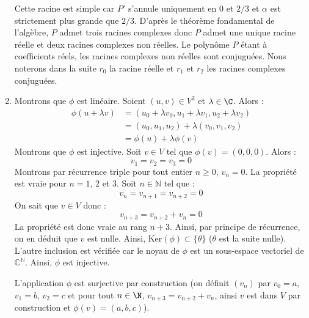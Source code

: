 \documentclass[a4paper,10pt]{report}
\begin{document}
\begin{enumerate}
\noindent Cette racine est simple car $P'$ s'annule uniquement en $0$ et $2/3$ et $\alpha$ est strictement plus grande que $2/3$. D'après le théorème fondamental de l'algèbre, $P$ admet trois racines complexes donc $P$ admet une unique racine réelle et deux racines complexes non réelles. Le polynôme $P$ étant à coefficients réels, les racines complexes non réelles sont conjuguées. Nous noterons dans la suite $r_0$ la racine réelle et $r_1$ et $r_2$ les racines complexes conjuguées.
 \item Montrons que $\phi$ est linéaire. Soient $(u,v)\in V^2$ et $\lambda\in\C$. Alors :
 \begin{align*}
\phi(u+\lambda v) & =(u_0+\lambda v_0,u_1+\lambda v_1,u_2+\lambda v_2) \\
& =(u_0,u_1,u_2)+\lambda(v_0,v_1,v_2) \\
& =\phi(u)+\lambda\phi(v)
\end{align*}
Montrons que $\phi$ est injective. Soit $v \in V$ tel que $\phi(v)=(0,0,0)$. Alors :
$$ v_1=v_2=v_3=0$$
Montrons par récurrence triple pour tout entier $n \geq 0$, $v_n=0$. La propriété est vraie pour $n=1$, $2$ et $3$. Soit $n \in \mathbb{N}$ tel que :
$$ v_n=v_{n+1}=v_{n+2} = 0$$
On sait que $v \in V$ donc :
$$ v_{n+3}=v_{n+2}+v_n = 0 $$
La propriété est donc vraie au rang $n+3$. Ainsi, par principe de récurrence, on en déduit que $v$ est nulle. Ainsi, $\textrm{Ker}(\phi) \subset \lbrace \theta \rbrace$ ($\theta$ est la suite nulle). L'autre inclusion est vérifiée car le noyau de $\phi$ est un sous-espace vectoriel de $\mathbb{C}^{\mathbb{N}}$. Ainsi, $\phi$ est injective.


\medskip

\noindent L'application $\phi$ est surjective par construction (on définit $(v_n)$ par $v_0=a$, $v_1=b$, $v_2=c$ et pour tout $n\in\N$, $v_{n+3}=v_{n+2}+v_n$, ainsi $v$ est dans $V$ par construction et $\phi(v)=(a,b,c)$). 

\medskip



\end{enumerate}
\end{document}
